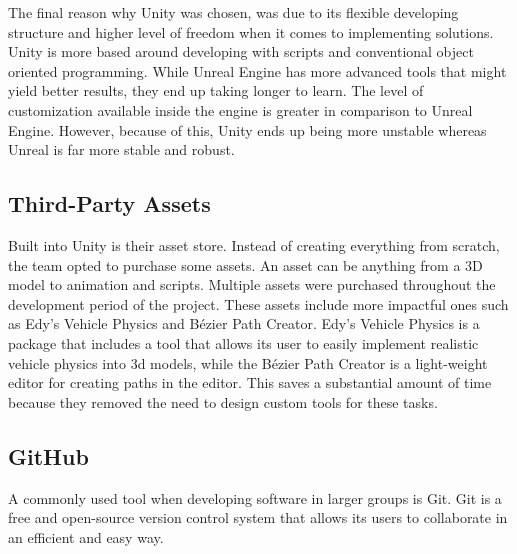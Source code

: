         The final reason why Unity was chosen, was due to its flexible developing structure and higher level of freedom when it comes to implementing solutions. Unity is more based around developing with scripts and conventional object oriented programming. While Unreal Engine has more advanced tools that might yield better results, they end up taking longer to learn. The level of customization available inside the engine is greater in comparison to Unreal Engine. However, because of this, Unity ends up being more unstable whereas Unreal is far more stable and robust.


    \subsection{Third-Party Assets}
        Built into Unity is their asset store. Instead of creating everything from scratch, the team opted to purchase some assets. An asset can be anything from a 3D model to animation and scripts. Multiple assets were purchased throughout the development period of the project. These assets include more impactful ones such as Edy's Vehicle Physics and Bézier Path Creator\cite{bpc}. Edy's Vehicle Physics is a package that includes a tool that allows its user to easily implement realistic vehicle physics into 3d models, while the Bézier Path Creator is a light-weight editor for creating paths in the editor. This saves a substantial amount of time because they removed the need to design custom tools for these tasks.

    \subsection{GitHub}
        A commonly used tool when developing software in larger groups is Git\cite{git}. Git is a free and open-source version control system that allows its users to collaborate in an efficient and easy way. 

